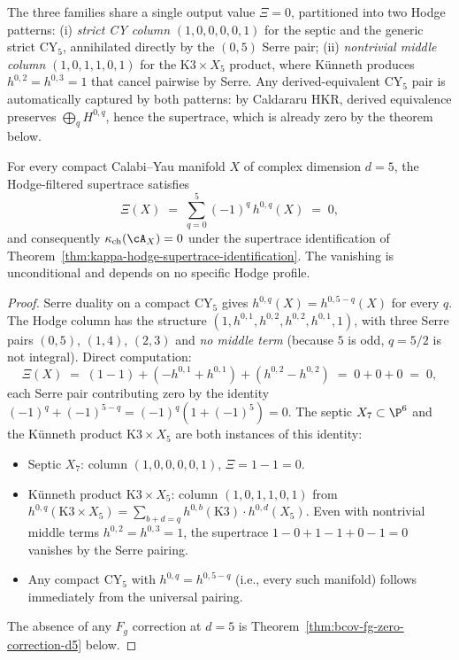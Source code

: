The three families share a single output value $\Xi = 0$, partitioned
into two Hodge patterns: (i) \emph{strict CY column} $(1,0,0,0,0,1)$ for
the septic and the generic strict CY$_5$, annihilated directly by the
$(0, 5)$ Serre pair; (ii) \emph{nontrivial middle column}
$(1,0,1,1,0,1)$ for the $\mathrm{K3} \times X_5$ product, where
K\"unneth produces $h^{0,2} = h^{0,3} = 1$ that cancel pairwise by
Serre. Any derived-equivalent CY$_5$ pair is automatically captured by
both patterns: by Caldararu HKR, derived equivalence preserves
$\bigoplus_q H^{0,q}$, hence the supertrace, which is already zero by
the theorem below.

\begin{theorem}[\texorpdfstring{$d = 5$}{d = 5} Universal Serre Cancellation]
\label{thm:cy-d-d5-stratification}
For every compact Calabi--Yau manifold $X$ of complex dimension $d = 5$,
the Hodge-filtered supertrace satisfies
\[
 \Xi(X) \;=\; \sum_{q = 0}^{5} (-1)^q\, h^{0,q}(X) \;=\; 0,
\]
and consequently $\kappa_{\mathrm{ch}}(\cA_X) = 0$ under the supertrace
identification of
Theorem~\ref{thm:kappa-hodge-supertrace-identification}. The vanishing
is unconditional and depends on no specific Hodge profile.
\end{theorem}

\begin{proof}
Serre duality on a compact CY$_5$ gives $h^{0,q}(X) = h^{0,5-q}(X)$ for
every $q$. The Hodge column has the structure
$(1, h^{0,1}, h^{0,2}, h^{0,2}, h^{0,1}, 1)$, with three Serre pairs
$(0, 5)$, $(1, 4)$, $(2, 3)$ and \emph{no middle term} (because $5$ is
odd, $q = 5/2$ is not integral). Direct computation:
\[
 \Xi(X) \;=\; (1 - 1) + (-h^{0,1} + h^{0,1}) + (h^{0,2} - h^{0,2})
 \;=\; 0 + 0 + 0 \;=\; 0,
\]
each Serre pair contributing zero by the identity
$(-1)^q + (-1)^{5-q} = (-1)^q (1 + (-1)^5) = 0$. The septic
$X_7 \subset \P^6$ and the K\"unneth product $\mathrm{K3} \times X_5$ are
both instances of this identity:
\begin{itemize}
\item Septic $X_7$: column $(1, 0, 0, 0, 0, 1)$, $\Xi = 1 - 1 = 0$.
\item K\"unneth product $\mathrm{K3} \times X_5$: column
$(1, 0, 1, 1, 0, 1)$ from $h^{0, q}(\mathrm{K3} \times X_5) =
\sum_{b + d = q} h^{0, b}(\mathrm{K3}) \cdot h^{0, d}(X_5)$. Even with
nontrivial middle terms $h^{0, 2} = h^{0, 3} = 1$, the supertrace
$1 - 0 + 1 - 1 + 0 - 1 = 0$ vanishes by the Serre pairing.
\item Any compact CY$_5$ with $h^{0, q} = h^{0, 5 - q}$ (i.e., every
 such manifold) follows immediately from the universal pairing.
\end{itemize}
The absence of any $F_g$ correction at $d = 5$ is
Theorem~\ref{thm:bcov-fg-zero-correction-d5} below.
\end{proof}


